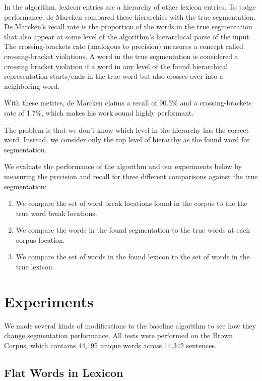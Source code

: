 \documentclass[11pt, oneside, fleqn]{article}
\begin{document}
	In the algorithm, lexicon entries are a hierarchy of other lexicon entries. To judge performance, de Marcken compared these hierarchies with the true segmentation. De Marcken's recall rate is the proportion of the words in the true segmentation that also appear at some level of the algorithm's hierarchical parse of the input. The crossing-brackets rate (analogous to precision) measures a concept called crossing-bracket violations. A word in the true segmentation is considered a crossing bracket violation if a word in any level of the found hierarchical representation starts/ends in the true word but also crosses over into a neighboring word.
    
    With these metrics, de Marcken claims a recall of 90.5\% and a crossing-brackets rate of 1.7\%, which makes his work sound highly performant.

	The problem is that we don't know which level in the hierarchy has the correct word. Instead, we consider only the top level of hierarchy as the found word for segmentation.

	We evaluate the performance of the algorithm and our experiments below by measuring the precision and recall for three different comparisons against the true segmentation:
	
	\begin{enumerate}
		\item We compare the set of word break locations found in the corpus to the the true word break locations.
		\item We compare the words in the found segmentation to the true words at each corpus location.
		\item We compare the set of words in the found lexicon to the set of words in the true lexicon.
	\end{enumerate}

  \section*{Experiments}
  
  We made several kinds of modifications to the baseline algorithm to see how they change segmentation performance. All tests were performed on the Brown Corpus, which contains 44,195 unique words across 14,342 sentences.

  \subsection{Flat Words in Lexicon}
  
\end{document}
